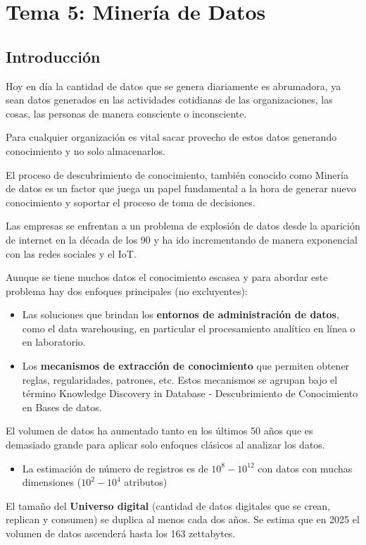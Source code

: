 \documentclass[12pt, twoside, openright]{report} %
\begin{document}
\chapter{Tema 5: Minería de Datos}
\section{Introducción}
Hoy en día la cantidad de datos que se genera diariamente es abrumadora, ya sean datos generados en las actividades cotidianas de las organizaciones, las cosas, las personas de manera consciente o inconsciente.

Para cualquier organización es vital sacar provecho de estos datos generando conocimiento y no solo almacenarlos.

El proceso  de descubrimiento de conocimiento, también conocido como Minería de datos es un factor que juega un papel fundamental a la hora de generar nuevo conocimiento y soportar el proceso de toma de decisiones.

Las empresas se enfrentan a un problema de explosión de datos desde la aparición de internet en la década de los 90 y ha ido incrementando de manera exponencial con las redes sociales y el IoT.

Aunque se tiene muchos datos el conocimiento escasea y para abordar este problema hay dos enfoques principales (no excluyentes):
\begin{itemize}
	\item Las soluciones que brindan los \textbf{entornos de administración de datos}, como el data warehousing, en particular el procesamiento analítico en línea o en laboratorio.
	\item Los \textbf{mecanismos de extracción de conocimiento} que permiten obtener reglas, regularidades, patrones, etc. Estos mecanismos se agrupan bajo el término Knowledge Discovery in Database - Descubrimiento de Conocimiento en Bases de datos.
\end{itemize}

El volumen de datos ha aumentado tanto en los últimos 50 años que es demasiado grande para aplicar solo enfoques clásicos al analizar los datos.
\begin{itemize}
	\item La estimación de número de registros es de $10^8 - 10^{12}$ con datos con muchas dimensiones ($10^2 - 10^4$ atributos)
\end{itemize}

El tamaño del \textbf{Universo digital} (cantidad de datos digitales que se crean, replican y consumen) se duplica al menos cada dos años. Se estima que en 2025 el volumen de datos ascenderá hasta los 163 zettabytes.
\end{document}
